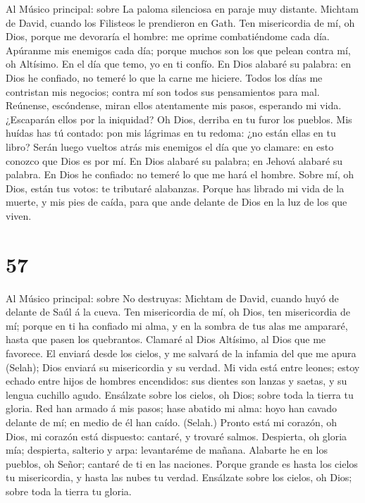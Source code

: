  Al Músico principal: sobre La paloma silenciosa en paraje
muy distante. Michtam de David, cuando los Filisteos le prendieron en
Gath. Ten misericordia de mí, oh Dios, porque me devoraría el hombre: me
oprime combatiéndome cada día.  Apúranme mis enemigos cada
día; porque muchos son los que pelean contra mí, oh Altísimo.
 En el día que temo, yo en ti confío.  En
Dios alabaré su palabra: en Dios he confiado, no temeré lo que la carne
me hiciere.  Todos los días me contristan mis negocios;
contra mí son todos sus pensamientos para mal.  Reúnense,
escóndense, miran ellos atentamente mis pasos, esperando mi vida.
 ¿Escaparán ellos por la iniquidad? Oh Dios, derriba en tu
furor los pueblos.  Mis huídas has tú contado: pon mis
lágrimas en tu redoma: ¿no están ellas en tu libro?  Serán
luego vueltos atrás mis enemigos el día que yo clamare: en esto conozco
que Dios es por mí.  En Dios alabaré su palabra; en
Jehová alabaré su palabra.  En Dios he confiado: no
temeré lo que me hará el hombre.  Sobre mí, oh Dios,
están tus votos: te tributaré alabanzas.  Porque has
librado mi vida de la muerte, y mis pies de caída, para que ande delante
de Dios en la luz de los que viven.

\hypertarget{section-56}{%
\section{57}\label{section-56}}

 Al Músico principal: sobre No destruyas: Michtam de
David, cuando huyó de delante de Saúl á la cueva. Ten misericordia de
mí, oh Dios, ten misericordia de mí; porque en ti ha confiado mi alma, y
en la sombra de tus alas me ampararé, hasta que pasen los quebrantos.
 Clamaré al Dios Altísimo, al Dios que me favorece.
 El enviará desde los cielos, y me salvará de la infamia
del que me apura (Selah); Dios enviará su misericordia y su verdad.
 Mi vida está entre leones; estoy echado entre hijos de
hombres encendidos: sus dientes son lanzas y saetas, y su lengua
cuchillo agudo.  Ensálzate sobre los cielos, oh Dios;
sobre toda la tierra tu gloria.  Red han armado á mis
pasos; hase abatido mi alma: hoyo han cavado delante de mí; en medio de
él han caído. (Selah.)  Pronto está mi corazón, oh Dios,
mi corazón está dispuesto: cantaré, y trovaré salmos. 
Despierta, oh gloria mía; despierta, salterio y arpa: levantaréme de
mañana.  Alabarte he en los pueblos, oh Señor; cantaré de
ti en las naciones.  Porque grande es hasta los cielos tu
misericordia, y hasta las nubes tu verdad.  Ensálzate
sobre los cielos, oh Dios; sobre toda la tierra tu gloria.

